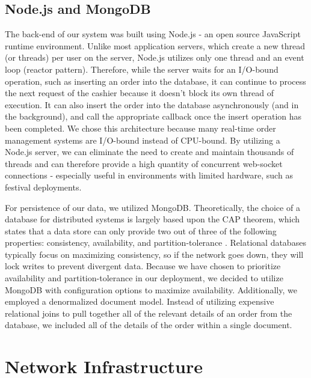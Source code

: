 \subsection{Node.js and MongoDB}
The back-end of our system was built using Node.js - an open source JavaScript runtime environment. Unlike most application servers, which create a new thread (or threads) per user on the server, Node.js utilizes only one thread and an event loop (reactor pattern). Therefore, while the server waits for an I/O-bound operation, such as inserting an order into the database, it can continue to process the next request of the cashier because it doesn’t block its own thread of execution. It can also insert the order into the database asynchronously (and in the background), and call the appropriate callback once the insert operation has been completed. We chose this architecture because many real-time order management systems are I/O-bound instead of CPU-bound. By utilizing a Node.js server, we can eliminate the need to create and maintain thousands of threads and can therefore provide a high quantity of concurrent web-socket connections - especially useful in environments with limited hardware, such as festival deployments.

For persistence of our data, we utilized MongoDB. Theoretically, the choice of a database for distributed systems is largely based upon the CAP theorem, which states that a data store can only provide two out of three of the following properties: consistency, availability, and partition-tolerance \cite{brewer2012cap}. Relational databases typically focus on maximizing consistency, so if the network goes down, they will lock writes to prevent divergent data. Because we have chosen to prioritize availability and partition-tolerance in our deployment, we decided to utilize MongoDB with configuration options to maximize availability. Additionally, we employed a denormalized document model. Instead of utilizing expensive relational joins to pull together all of the relevant details of an order from the database, we included all of the details of the order within a single document.

\section{Network Infrastructure}

